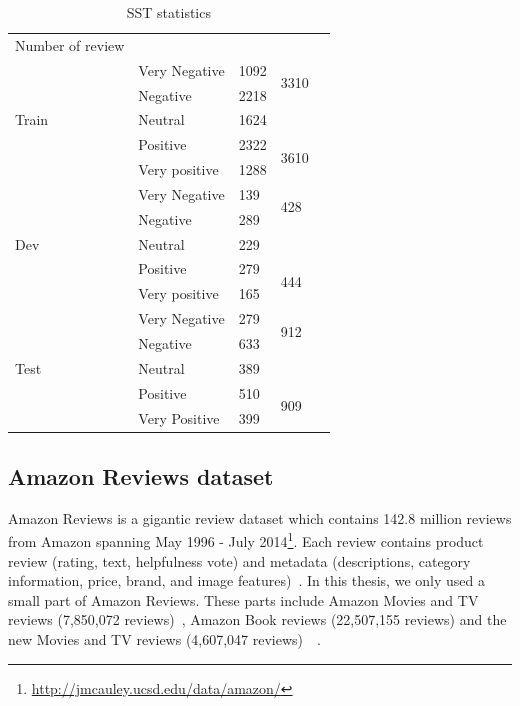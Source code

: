 \begin{table}[H]
    \centering
    \caption{SST statistics}
    \label{table:sststatistic}
    \begin{tabular}{lllll}
        Number of review       &               &      &                       &  \\ \cline{1-4}
        \multirow{5}{*}{Train} & Very Negative & 1092 & \multirow{2}{*}{3310} &  \\ \cline{2-3}
        & Negative      & 2218 &                       &  \\ \cline{2-4}
        & Neutral       & 1624 &                       &  \\ \cline{2-4}
        & Positive      & 2322 & \multirow{2}{*}{3610} &  \\ \cline{2-3}
        & Very positive & 1288 &                       &  \\ \cline{1-4}
        \multirow{5}{*}{Dev}   & Very Negative & 139  & \multirow{2}{*}{428}  &  \\ \cline{2-3}
        & Negative      & 289  &                       &  \\ \cline{2-4}
        & Neutral       & 229  &                       &  \\ \cline{2-4}
        & Positive      & 279  & \multirow{2}{*}{444}  &  \\ \cline{2-3}
        & Very positive & 165  &                       &  \\ \cline{1-4}
        \multirow{5}{*}{Test}  & Very Negative & 279  & \multirow{2}{*}{912}  &  \\ \cline{2-3}
        & Negative      & 633  &                       &  \\ \cline{2-4}
        & Neutral       & 389  &                       &  \\ \cline{2-4}
        & Positive      & 510  & \multirow{2}{*}{909}  &  \\ \cline{2-3}
        & Very Positive & 399  &                       &  \\ \cline{2-4}
    \end{tabular}
\end{table}

\subsection{Amazon Reviews dataset}\label{sec:amazon}
Amazon Reviews is a gigantic review dataset
which contains 142.8 million reviews from Amazon spanning May 1996 - July 2014\footnote{\url{http://jmcauley.ucsd.edu/data/amazon/}}.
Each review contains product review (rating, text, helpfulness vote) and metadata (descriptions, category information, price, brand, and image features)~\cite{amazon-reviews}.
In this thesis, we only used a small part of Amazon Reviews.
These parts include Amazon Movies and TV reviews (7,850,072 reviews)~\cite{mcauley2013hidden}, Amazon Book reviews (22,507,155 reviews) and the new Movies and TV reviews (4,607,047 reviews)~\cite{McAuleyTSH15}~\cite{HeM16}. 

